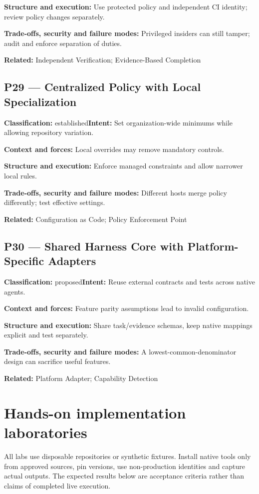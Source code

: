 \documentclass[11pt,letterpaper]{article}
\begin{document}
\textbf{Structure and execution:} Use protected policy and independent CI identity; review policy changes separately.

\textbf{Trade-offs, security and failure modes:} Privileged insiders can still tamper; audit and enforce separation of duties.

\textbf{Related:} Independent Verification; Evidence-Based Completion

\subsection*{P29 --- Centralized Policy with Local Specialization}
\textbf{Classification:} established\quad\textbf{Intent:} Set organization-wide minimums while allowing repository variation.

\textbf{Context and forces:} Local overrides may remove mandatory controls.

\textbf{Structure and execution:} Enforce managed constraints and allow narrower local rules.

\textbf{Trade-offs, security and failure modes:} Different hosts merge policy differently; test effective settings.

\textbf{Related:} Configuration as Code; Policy Enforcement Point

\subsection*{P30 --- Shared Harness Core with Platform-Specific Adapters}
\textbf{Classification:} proposed\quad\textbf{Intent:} Reuse external contracts and tests across native agents.

\textbf{Context and forces:} Feature parity assumptions lead to invalid configuration.

\textbf{Structure and execution:} Share task/evidence schemas, keep native mappings explicit and test separately.

\textbf{Trade-offs, security and failure modes:} A lowest-common-denominator design can sacrifice useful features.

\textbf{Related:} Platform Adapter; Capability Detection

\clearpage\section{Hands-on implementation laboratories}
All labs use disposable repositories or synthetic fixtures. Install native tools only from approved sources, pin versions, use non-production identities and capture actual outputs. The expected results below are acceptance criteria rather than claims of completed live execution.
\end{document}
